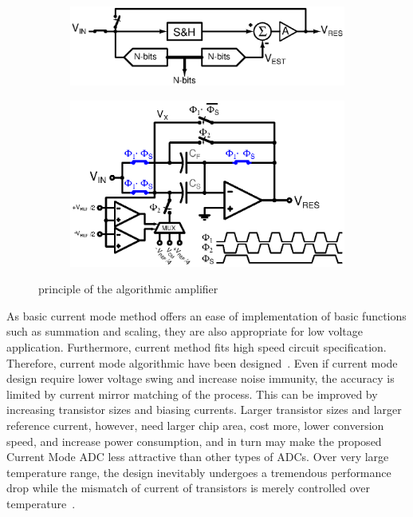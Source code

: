 \begin{figure}[htp]
	\centering
    \begin{subfigure}[b]{0.5\textwidth}
        \includegraphics[width=\textwidth]{algorithmic_principle.ps}
        \label{fig:algo_principle}
	\end{subfigure}
	\begin{subfigure}[b]{0.48\textwidth}
        \includegraphics[width=\textwidth]{algo_mdac_std.ps}
        \label{fig:algo_mdac}
    \end{subfigure}
	\caption{principle of the algorithmic amplifier}
	\label{fig:algo_desc}
\end{figure}

As basic current mode method offers an ease of implementation of basic functions such as summation and scaling, they are also appropriate for low voltage application. Furthermore, current method fits high speed circuit specification. Therefore, current mode algorithmic have been designed~\cite{Nairn1990,Wang1991,Khodabndehloo2009,Bhatia2011}. Even if current mode design require lower voltage swing and increase noise immunity, the accuracy is limited by current mirror matching of the process. This can be
improved by increasing transistor sizes and biasing currents. Larger transistor sizes and larger reference current, however, need larger chip area, cost more, lower conversion speed, and increase power consumption, and in turn may make the proposed Current Mode ADC less attractive than other types of ADCs\cite{Wang1991}. Over very large temperature range, the design inevitably undergoes a tremendous performance drop while the mismatch of current of transistors is merely controlled over temperature~\cite{Shoucair1989, Andricciola2009}.

